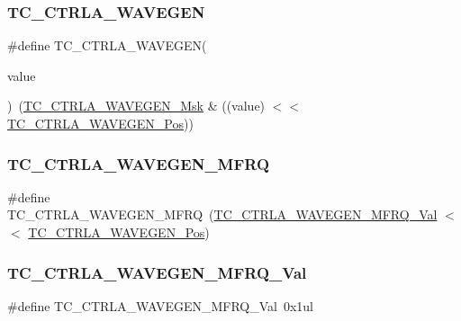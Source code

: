 \subsubsection{\texorpdfstring{TC\_CTRLA\_WAVEGEN}{TC\_CTRLA\_WAVEGEN}}
{\footnotesize\ttfamily \#define T\+C\+\_\+\+C\+T\+R\+L\+A\+\_\+\+W\+A\+V\+E\+G\+EN(\begin{DoxyParamCaption}\item[{}]{value }\end{DoxyParamCaption})~(\mbox{\hyperlink{group___s_a_m_d21___t_c_ga7ef4b63910cf44d2411323b41731a607}{T\+C\+\_\+\+C\+T\+R\+L\+A\+\_\+\+W\+A\+V\+E\+G\+E\+N\+\_\+\+Msk}} \& ((value) $<$$<$ \mbox{\hyperlink{group___s_a_m_d21___t_c_gaba0fb608da3c78b2792cbc1be030ab27}{T\+C\+\_\+\+C\+T\+R\+L\+A\+\_\+\+W\+A\+V\+E\+G\+E\+N\+\_\+\+Pos}}))}

\mbox{\label{group___s_a_m_d21___t_c_ga481c00b2ec0ab62d5c321b1f3fb32493}} 
\subsubsection{\texorpdfstring{TC\_CTRLA\_WAVEGEN\_MFRQ}{TC\_CTRLA\_WAVEGEN\_MFRQ}}
{\footnotesize\ttfamily \#define T\+C\+\_\+\+C\+T\+R\+L\+A\+\_\+\+W\+A\+V\+E\+G\+E\+N\+\_\+\+M\+F\+RQ~(\mbox{\hyperlink{group___s_a_m_d21___t_c_gac1da546f8dc27dd767fda8f201a8d0ad}{T\+C\+\_\+\+C\+T\+R\+L\+A\+\_\+\+W\+A\+V\+E\+G\+E\+N\+\_\+\+M\+F\+R\+Q\+\_\+\+Val}}     $<$$<$ \mbox{\hyperlink{group___s_a_m_d21___t_c_gaba0fb608da3c78b2792cbc1be030ab27}{T\+C\+\_\+\+C\+T\+R\+L\+A\+\_\+\+W\+A\+V\+E\+G\+E\+N\+\_\+\+Pos}})}

\mbox{\label{group___s_a_m_d21___t_c_gac1da546f8dc27dd767fda8f201a8d0ad}} 
\subsubsection{\texorpdfstring{TC\_CTRLA\_WAVEGEN\_MFRQ\_Val}{TC\_CTRLA\_WAVEGEN\_MFRQ\_Val}}
{\footnotesize\ttfamily \#define T\+C\+\_\+\+C\+T\+R\+L\+A\+\_\+\+W\+A\+V\+E\+G\+E\+N\+\_\+\+M\+F\+R\+Q\+\_\+\+Val~0x1ul}



